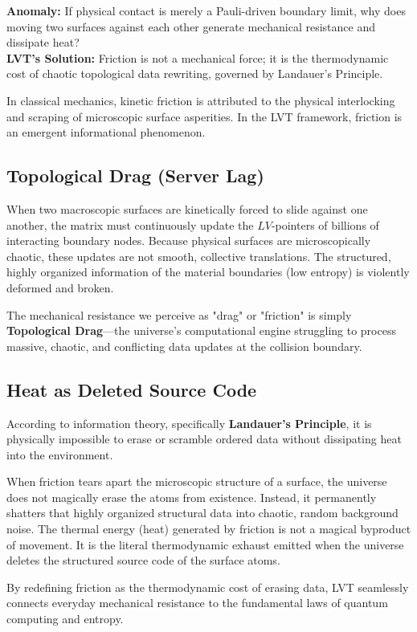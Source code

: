\documentclass[12pt,a4paper]{article}
\begin{document}
\textbf{Anomaly:} If physical contact is merely a Pauli-driven boundary limit, why does moving two surfaces against each other generate mechanical resistance and dissipate heat? \\
\textbf{LVT's Solution:} Friction is not a mechanical force; it is the thermodynamic cost of chaotic topological data rewriting, governed by Landauer's Principle.

In classical mechanics, kinetic friction is attributed to the physical interlocking and scraping of microscopic surface asperities. In the LVT framework, friction is an emergent informational phenomenon.

\subsection{Topological Drag (Server Lag)}
When two macroscopic surfaces are kinetically forced to slide against one another, the matrix must continuously update the $LV$-pointers of billions of interacting boundary nodes. Because physical surfaces are microscopically chaotic, these updates are not smooth, collective translations. The structured, highly organized information of the material boundaries (low entropy) is violently deformed and broken. 

The mechanical resistance we perceive as "drag" or "friction" is simply \textbf{Topological Drag}—the universe's computational engine struggling to process massive, chaotic, and conflicting data updates at the collision boundary. 



\subsection{Heat as Deleted Source Code}
According to information theory, specifically \textbf{Landauer's Principle}, it is physically impossible to erase or scramble ordered data without dissipating heat into the environment. 

When friction tears apart the microscopic structure of a surface, the universe does not magically erase the atoms from existence. Instead, it permanently shatters that highly organized structural data into chaotic, random background noise. The thermal energy (heat) generated by friction is not a magical byproduct of movement. It is the literal thermodynamic exhaust emitted when the universe deletes the structured source code of the surface atoms.

By redefining friction as the thermodynamic cost of erasing data, LVT seamlessly connects everyday mechanical resistance to the fundamental laws of quantum computing and entropy.
\end{document}
